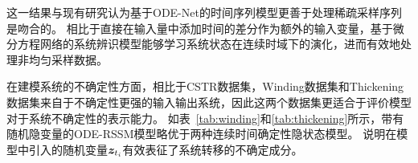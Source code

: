 这一结果与现有研究认为基于ODE-Net的时间序列模型更善于处理稀疏采样序列是吻合的\cite{Quaglino2019}。
相比于直接在输入量中添加时间的差分作为额外的输入变量，基于微分方程网络的系统辨识模型能够学习系统状态在连续时域下的演化，进而有效地处理非均匀采样数据。



在建模系统的不确定性方面，相比于CSTR数据集，Winding数据集和Thickening数据集来自于不确定性更强的输入输出系统，因此这两个数据集更适合于评价模型对于系统不确定性的表示能力。
如表~\ref{tab:winding}和\ref{tab:thickening}所示，带有随机隐变量的ODE-RSSM模型略优于两种连续时间确定性隐状态模型。
说明在模型中引入的随机变量$\boldsymbol{z}_{t_i}$有效表征了系统转移的不确定成分。

